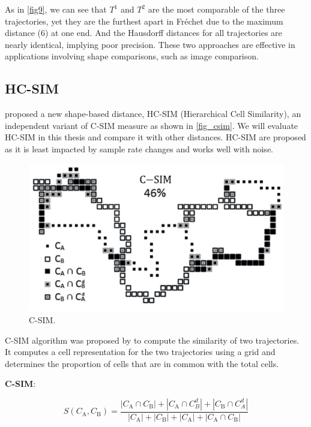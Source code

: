 \documentclass[a4paper, 12pt]{article}
\newcommand{\myequations}[1]{
   \addcontentsline{equ}{myequations}{\protect\numberline{\theequation}#1}
}
\begin{document}
As in \autoref{fig9}, we can see that $T^1$ and $T^2$ are the most comparable of the three trajectories, yet they are the furthest apart in Fréchet due to the maximum distance (6) at one end. And the Hausdorff distances for all trajectories are nearly identical, implying poor precision. These two approaches are effective in applications involving shape comparisons, such as image comparison. 

\subsection{HC-SIM}
\cite{franti2021averaging} proposed a new shape-based distance, HC-SIM (Hierarchical Cell Similarity), an independent variant of C-SIM measure as shown in \autoref{fig_csim}. We will evaluate HC-SIM in this thesis and compare it with other distances. HC-SIM are proposed as it is least impacted by sample rate changes and works well with noise.

\begin{figure}[htbp!]
    \centering
    \includegraphics[width=1\textwidth]{csim.png}
    \caption{C-SIM.}
    \label{fig_csim}
\end{figure}

C-SIM algorithm was proposed by \cite{mariescu2017grid} to compute the similarity of two trajectories. It computes a cell representation for the two trajectories using a grid and determines the proportion of cells that are in common with the total cells. 

\textbf{C-SIM}:

\begin{equation} \label{eq7}
    S\left(C_{\mathrm{A}}, C_{\mathrm{B}}\right)=\frac{\left|C_{\mathrm{A}} \cap C_{\mathrm{B}}\right|+\left|C_{\mathrm{A}} \cap C_{B}^{d}\right|+\left|C_{\mathrm{B}} \cap C_{A}^{d}\right|}{\left|C_{\mathrm{A}}\right|+\left|C_{\mathrm{B}}\right|+\left|C_{\mathrm{A}}\right|+\left|C_{\mathrm{A}} \cap C_{\mathrm{B}}\right|}
\end{equation}
\myequations{C-SIM}
\end{document}
